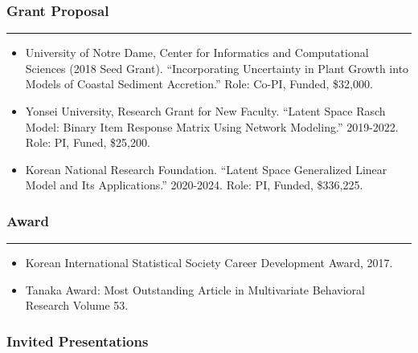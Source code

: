 \documentclass[
]{book}
\providecommand{\tightlist}{%
  \setlength{\itemsep}{0pt}\setlength{\parskip}{0pt}}
\begin{document}
\hypertarget{grant-proposal}{%
\subsubsection*{Grant Proposal}\label{grant-proposal}}

\begin{center}\rule{0.5\linewidth}{0.5pt}\end{center}

\begin{itemize}
\item
  University of Notre Dame, Center for Informatics and Computational Sciences (2018 Seed Grant). ``Incorporating Uncertainty in Plant Growth into Models of Coastal Sediment Accretion.'' Role: Co-PI, Funded, \$32,000.
\item
  Yonsei University, Research Grant for New Faculty. ``Latent Space Rasch Model: Binary Item Response Matrix Using Network Modeling.'' 2019-2022. Role: PI, Funed, \$25,200.
\item
  Korean National Research Foundation. ``Latent Space Generalized Linear Model and Its Applications.'' 2020-2024. Role: PI, Funded, \$336,225.
\end{itemize}

\hypertarget{award}{%
\subsubsection*{Award}\label{award}}

\begin{center}\rule{0.5\linewidth}{0.5pt}\end{center}

\begin{itemize}
\tightlist
\item
  Korean International Statistical Society Career Development Award, 2017.
\item
  Tanaka Award: Most Outstanding Article in Multivariate Behavioral Research Volume 53.
\end{itemize}

\hypertarget{invited-presentations}{%
\subsubsection*{Invited Presentations}\label{invited-presentations}}
\end{document}
